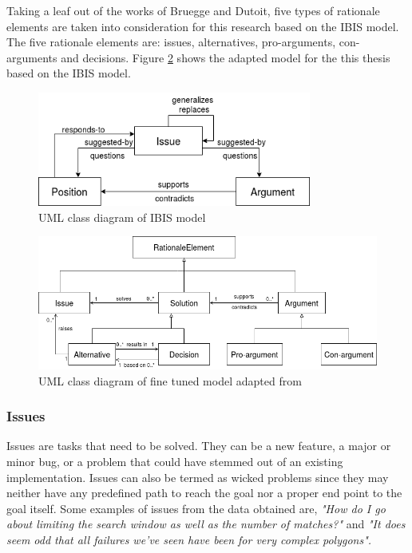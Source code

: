 \documentclass[a4paper,12pt,twoside]{report}
\begin{document}
\newline \newline
Taking a leaf out of the works of Bruegge and Dutoit\cite{Bruegge2009}, five types of rationale elements are taken into consideration for this research based on the IBIS model. The five rationale elements are: issues, alternatives, pro-arguments, con-arguments and decisions. Figure \ref{fig:thesisClassModel} shows the adapted model for the this thesis based on the IBIS model. 
\begin{figure}[h] %
    \centering
    \includegraphics[width=9cm]{ibis-model}
    \caption{UML class diagram of IBIS model \cite{Kunz1970}}
    \label{fig:ibisModel}
\end{figure}

\begin{figure}[h] %
    \centering
    \includegraphics[width=12cm]{thesis-class-diagram}
    \caption{UML class diagram of fine tuned model adapted from \cite{Kunz1970}}
    \label{fig:thesisClassModel}
\end{figure}

 
\subsubsection{Issues}
Issues are tasks that need to be solved. They can be a new feature, a major or minor bug, or a problem that could have stemmed out of an existing implementation. Issues can also be termed as wicked problems \cite{Rittel1973} since they may neither have any predefined path to reach the goal nor a proper end point to the goal itself. Some examples of issues from the data obtained are, \textit{"How do I go about limiting the search window as well as the number of matches?"} and \textit{"It does seem odd that all failures we've seen have been for very complex polygons".}  
\end{document}
